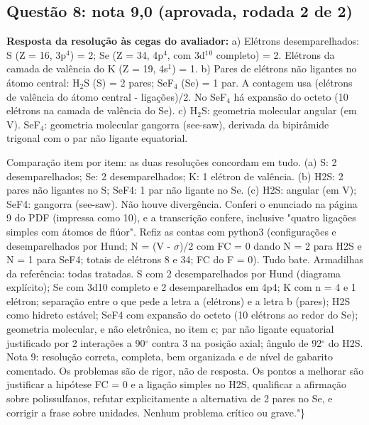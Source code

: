 \documentclass{article}%
\begin{document}
\subsection*{Questão 8: nota 9,0 (aprovada, rodada 2 de 2)}%
\textbf{Resposta da resolução às cegas do avaliador:} a) Elétrons desemparelhados: S (Z = 16, 3p$^{4}$) = 2; Se (Z = 34, 4p$^{4}$, com 3d$^{1}$$^{0}$ completo) = 2. Elétrons da camada de valência do K (Z = 19, 4s$^{1}$) = 1.\newline%
\newline%
b) Pares de elétrons não ligantes no átomo central: H$_{2}$S (S) = 2 pares; SeF$_{4}$ (Se) = 1 par. A contagem usa (elétrons de valência do átomo central - ligações)/2. No SeF$_{4}$ há expansão do octeto (10 elétrons na camada de valência do Se).\newline%
\newline%
c) H$_{2}$S: geometria molecular angular (em V). SeF$_{4}$: geometria molecular gangorra (see{-}saw), derivada da bipirâmide trigonal com o par não ligante equatorial.\par %
Comparação item por item: as duas resoluções concordam em tudo. (a) S: 2 desemparelhados; Se: 2 desemparelhados; K: 1 elétron de valência. (b) H2S: 2 pares não ligantes no S; SeF4: 1 par não ligante no Se. (c) H2S: angular (em V); SeF4: gangorra (see{-}saw). Não houve divergência. Conferi o enunciado na página 9 do PDF (impressa como 10), e a transcrição confere, inclusive "quatro ligações simples com átomos de flúor". Refiz as contas com python3 (configurações e desemparelhados por Hund; N = (V - $\sigma$)/2 com FC = 0 dando N = 2 para H2S e N = 1 para SeF4; totais de elétrons 8 e 34; FC do F = 0). Tudo bate. Armadilhas da referência: todas tratadas. S com 2 desemparelhados por Hund (diagrama explícito); Se com 3d10 completo e 2 desemparelhados em 4p4; K com n = 4 e 1 elétron; separação entre o que pede a letra a (elétrons) e a letra b (pares); H2S como hidreto estável; SeF4 com expansão do octeto (10 elétrons ao redor do Se); geometria molecular, e não eletrônica, no item c; par não ligante equatorial justificado por 2 interações a 90$^\circ$ contra 3 na posição axial; ângulo de 92$^\circ$ do H2S. Nota 9: resolução correta, completa, bem organizada e de nível de gabarito comentado. Os problemas são de rigor, não de resposta. Os pontos a melhorar são justificar a hipótese FC = 0 e a ligação simples no H2S, qualificar a afirmação sobre polissulfanos, refutar explicitamente a alternativa de 2 pares no Se, e corrigir a frase sobre unidades. Nenhum problema crítico ou grave."\}%
$$
\end{document}
